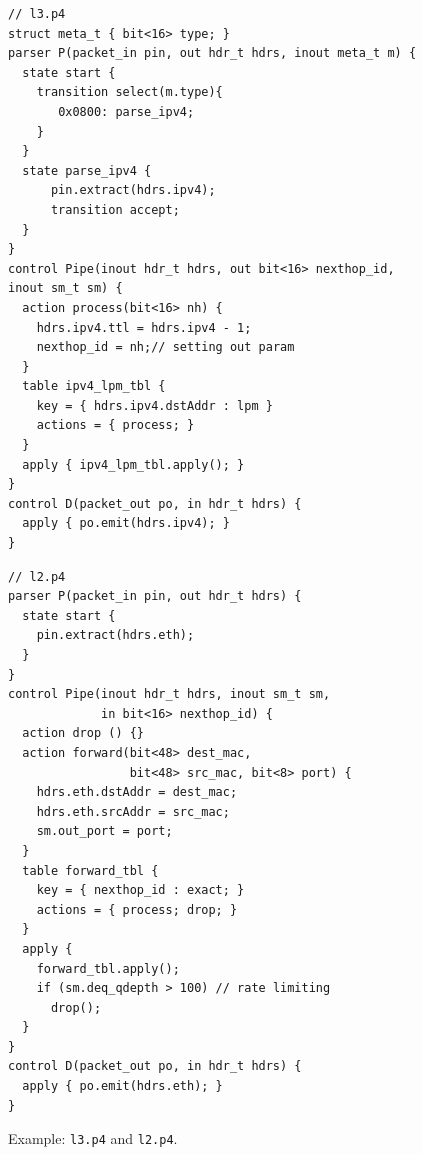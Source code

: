 \begin{figure}[!ht]
\noindent \begin{minipage}[t]{.48\textwidth}
\begin{lstlisting}[frame=none]
// l3.p4
struct meta_t { bit<16> type; }
parser P(packet_in pin, out hdr_t hdrs, inout meta_t m) {
  state start {
    transition select(m.type){
       0x0800: parse_ipv4;
    }
  }
  state parse_ipv4 {
      pin.extract(hdrs.ipv4);
      transition accept;
  }
}
control Pipe(inout hdr_t hdrs, out bit<16> nexthop_id, inout sm_t sm) {
  action process(bit<16> nh) {
    hdrs.ipv4.ttl = hdrs.ipv4 - 1;
    nexthop_id = nh;// setting out param
  }
  table ipv4_lpm_tbl {
    key = { hdrs.ipv4.dstAddr : lpm } 
    actions = { process; }
  }
  apply { ipv4_lpm_tbl.apply(); }
}
control D(packet_out po, in hdr_t hdrs) {
  apply { po.emit(hdrs.ipv4); }
}
\end{lstlisting}
\end{minipage}\vline
\hfill\begin{minipage}[t]{.48\textwidth}
\begin{lstlisting}[frame=none]
// l2.p4
parser P(packet_in pin, out hdr_t hdrs) {
  state start {
    pin.extract(hdrs.eth);
  }
}
control Pipe(inout hdr_t hdrs, inout sm_t sm, 
             in bit<16> nexthop_id) {
  action drop () {}           
  action forward(bit<48> dest_mac, 
                 bit<48> src_mac, bit<8> port) {
    hdrs.eth.dstAddr = dest_mac;
    hdrs.eth.srcAddr = src_mac;
    sm.out_port = port;    
  }
  table forward_tbl {
    key = { nexthop_id : exact; } 
    actions = { process; drop; }
  }
  apply {
    forward_tbl.apply(); 
    if (sm.deq_qdepth > 100) // rate limiting
      drop();
  }
}
control D(packet_out po, in hdr_t hdrs) {
  apply { po.emit(hdrs.eth); }
}
\end{lstlisting}
\end{minipage}
\caption{Example: \texttt{l3.p4} and \texttt{l2.p4}.}
\label{fig:l3.p4.l2.p4}
\end{figure}



